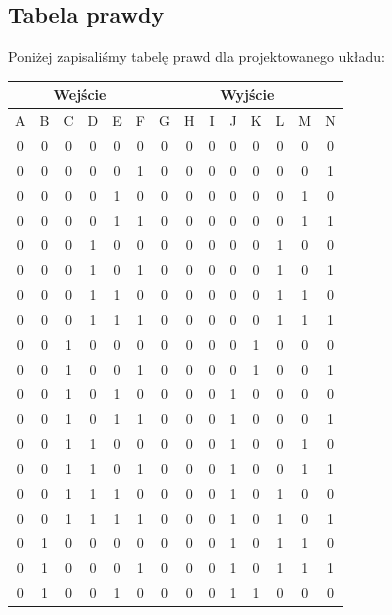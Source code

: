 \documentclass[a4paper]{article}
\begin{document}
\subsection{Tabela prawdy}
Poniżej zapisaliśmy tabelę prawd dla projektowanego układu:
\begin{center}
  \begin{tabular}{|c|c|c|c|c|c||c|c|c|c|c|c|c|c|}
  \hline \multicolumn{6}{|c||}{Wejście} & \multicolumn{8}{|c|}{Wyjście} \\
  \hline A & B & C & D & E & F & G   &    H & I & J & K & L & M & N \\
  \hline 0 & 0 & 0 & 0 & 0 & 0 & 0   &  	0 &	0 &	0 &	0 &	0	& 0	& 0 \\
  \hline 0 & 0 & 0 & 0 & 0 & 1 & 0   &  	0 &	0 &	0 &	0 &	0	& 0	& 1 \\
  \hline 0 & 0 & 0 & 0 & 1 & 0 & 0   &  	0 &	0 &	0 &	0 &	0	& 1	& 0 \\
  \hline 0 & 0 & 0 & 0 & 1 & 1 & 0   &  	0 &	0 &	0 &	0 &	0	& 1	& 1 \\
  \hline 0 & 0 & 0 & 1 & 0 & 0 & 0   &  	0 &	0 &	0 &	0 &	1	& 0	& 0 \\
  \hline 0 & 0 & 0 & 1 & 0 & 1 & 0   &  	0 &	0 &	0 &	0 &	1	& 0	& 1 \\
  \hline 0 & 0 & 0 & 1 & 1 & 0 & 0   &  	0 &	0 &	0 &	0 &	1	& 1	& 0 \\
  \hline 0 & 0 & 0 & 1 & 1 & 1 & 0   &  	0 &	0 &	0 &	0 &	1	& 1	& 1 \\
  \hline 0 & 0 & 1 & 0 & 0 & 0 & 0   &  	0 &	0 &	0 &	1 &	0	& 0	& 0 \\
  \hline 0 & 0 & 1 & 0 & 0 & 1 & 0   &  	0 &	0 &	0 &	1 &	0	& 0	& 1 \\
  \hline 0 & 0 & 1 & 0 & 1 & 0 & 0   &  	0 &	0 &	1 &	0 &	0	& 0	& 0 \\
  \hline 0 & 0 & 1 & 0 & 1 & 1 & 0   &  	0 &	0 &	1 &	0 &	0	& 0	& 1 \\
  \hline 0 & 0 & 1 & 1 & 0 & 0 & 0   &  	0 &	0 &	1 &	0 &	0	& 1	& 0 \\
  \hline 0 & 0 & 1 & 1 & 0 & 1 & 0   &  	0 &	0 &	1 &	0 &	0	& 1	& 1 \\
  \hline 0 & 0 & 1 & 1 & 1 & 0 & 0   &  	0 &	0 &	1 &	0 &	1	& 0	& 0 \\
  \hline 0 & 0 & 1 & 1 & 1 & 1 & 0   &  	0 &	0 &	1 &	0 &	1	& 0	& 1 \\
  \hline 0 & 1 & 0 & 0 & 0 & 0 & 0   &  	0 &	0 &	1 &	0 &	1	& 1	& 0 \\
  \hline 0 & 1 & 0 & 0 & 0 & 1 & 0   &  	0 &	0 &	1 &	0 &	1	& 1	& 1 \\
  \hline 0 & 1 & 0 & 0 & 1 & 0 & 0   &  	0 &	0 &	1 &	1 &	0	& 0	& 0 \\

\end{tabular}
\end{center}
\end{document}
